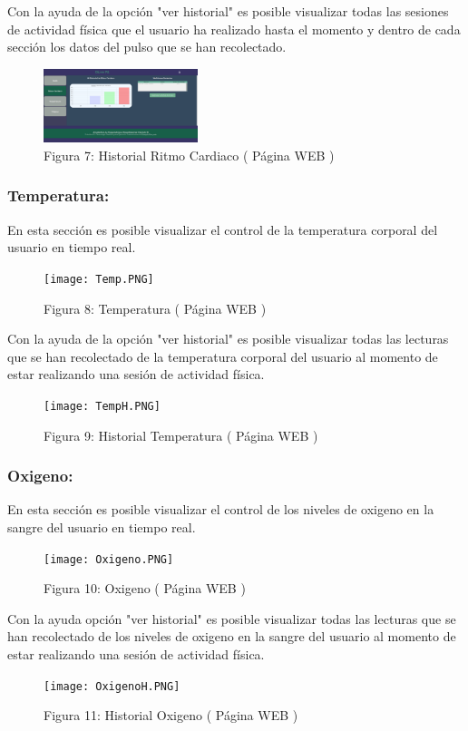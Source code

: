 \documentclass[osajnl,twocolumn,showpacs,superscriptaddress,10pt]{revtex4-1}
\begin{document}
    Con la ayuda de la opción "ver historial" es posible visualizar todas las sesiones de actividad física que el usuario ha realizado hasta el momento y dentro de cada sección los datos del pulso que se han recolectado.
    
\begin{figure} [H] \centering 
\caption{Figura 7: Historial Ritmo Cardiaco ( Página WEB )}
\includegraphics[width=0.4\textwidth]{RitmoCh.PNG}
\end{figure}

\subsubsection{Temperatura:}
    En esta sección es posible visualizar el control de la temperatura corporal del usuario en tiempo real.
    
\begin{figure} [H] \centering 
\caption{Figura 8: Temperatura ( Página WEB )}
\texttt{[image: Temp.PNG]}
\end{figure}

    Con la ayuda de la opción "ver historial" es posible visualizar todas las lecturas que se han recolectado de la temperatura corporal del usuario al momento de estar realizando una sesión de actividad física.
    
\begin{figure} [H] \centering 
\caption{Figura 9: Historial Temperatura ( Página WEB )}
\texttt{[image: TempH.PNG]}
\end{figure}

\subsubsection{Oxigeno:}
    En esta sección es posible visualizar el control de los niveles de oxigeno en la sangre del usuario en tiempo real.
    
\begin{figure} [H] \centering 
\caption{Figura 10: Oxigeno ( Página WEB )}
\texttt{[image: Oxigeno.PNG]}
\end{figure}

    Con la ayuda opción "ver historial" es posible visualizar todas las lecturas que se han recolectado de los niveles de oxigeno en la sangre del usuario al momento de estar realizando una sesión de actividad física.
    
\begin{figure} [H] \centering 
\caption{Figura 11: Historial Oxigeno ( Página WEB )}
\texttt{[image: OxigenoH.PNG]}
\end{figure}
\end{document}
